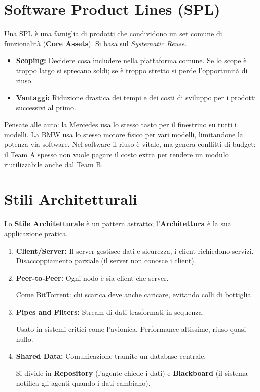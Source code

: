 \section{Software Product Lines (SPL)}
Una SPL è una famiglia di prodotti che condividono un set comune di funzionalità (\textbf{Core Assets}). Si basa sul \textit{Systematic Reuse}.

\begin{itemize}
    \item \textbf{Scoping:} Decidere cosa includere nella piattaforma comune. Se lo scope è troppo largo si sprecano soldi; se è troppo stretto si perde l'opportunità di riuso.
    \item \textbf{Vantaggi:} Riduzione drastica dei tempi e dei costi di sviluppo per i prodotti successivi al primo.
\end{itemize}

\begin{notaprof}
Pensate alle auto: la Mercedes usa lo stesso tasto per il finestrino su tutti i modelli. La BMW usa lo stesso motore fisico per vari modelli, limitandone la potenza via software. Nel software il riuso è vitale, ma genera conflitti di budget: il Team A spesso non vuole pagare il costo extra per rendere un modulo riutilizzabile anche dal Team B.
\end{notaprof}

\section{Stili Architetturali}
Lo \textbf{Stile Architetturale} è un pattern astratto; l'\textbf{Architettura} è la sua applicazione pratica.

\begin{enumerate}
    \item \textbf{Client/Server:} Il server gestisce dati e sicurezza, i client richiedono servizi. Disaccoppiamento parziale (il server non conosce i client).
    \item \textbf{Peer-to-Peer:} Ogni nodo è sia client che server. \begin{notaprof}Come BitTorrent: chi scarica deve anche caricare, evitando colli di bottiglia.\end{notaprof}
    \item \textbf{Pipes and Filters:} Stream di dati trasformati in sequenza. \begin{notaprof}Usato in sistemi critici come l'avionica. Performance altissime, riuso quasi nullo.\end{notaprof}
    \item \textbf{Shared Data:} Comunicazione tramite un database centrale.
    \begin{notaslide}
    Si divide in \textbf{Repository} (l'agente chiede i dati) e \textbf{Blackboard} (il sistema notifica gli agenti quando i dati cambiano).
    \end{notaslide}
\end{enumerate}